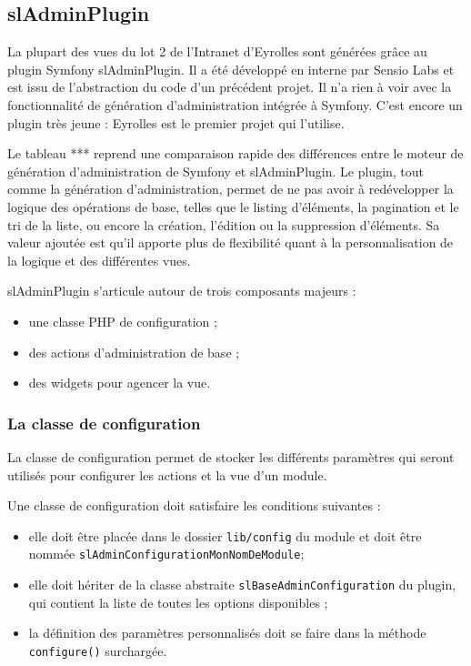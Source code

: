 \newpage
\subsection{slAdminPlugin}

La plupart des vues du lot 2 de l'Intranet d'Eyrolles sont générées grâce au plugin Symfony slAdminPlugin. Il a été développé en interne par Sensio Labs et est issu de l'abstraction du code d'un précédent projet. Il n'a rien à voir avec la fonctionnalité de génération d'administration intégrée à Symfony. C'est encore un plugin très jeune : Eyrolles est le premier projet qui l'utilise.


Le tableau *** reprend une comparaison rapide des différences entre le moteur de génération d'administration de Symfony et slAdminPlugin. Le plugin, tout comme la génération d'administration, permet de ne pas avoir à redévelopper la logique des opérations de base, telles que le listing d'éléments, la pagination et le tri de la liste, ou encore la création, l'édition ou la suppression d'éléments. Sa valeur ajoutée est qu'il apporte plus de flexibilité quant à la personnalisation de la logique et des différentes vues.

slAdminPlugin s'articule autour de trois composants majeurs :
\begin{itemize}
\item une classe PHP de configuration ;
\item des actions d'administration de base ;
\item des widgets pour agencer la vue.
\end{itemize}

\subsubsection{La classe de configuration}

La classe de configuration permet de stocker les différents paramètres qui seront utilisés pour configurer les actions et la vue d'un module.

Une classe de configuration doit satisfaire les conditions suivantes :
\begin{itemize}
\item elle doit être placée dans le dossier \texttt{lib/config} du module et doit être nommée \texttt{slAdminConfigurationMonNomDeModule};
\item elle doit hériter de la classe abstraite \texttt{slBaseAdminConfiguration} du plugin, qui contient la liste de toutes les options disponibles ;
\item la définition des paramètres personnalisés doit se faire dans la méthode \texttt{configure()} surchargée.
\end{itemize}

